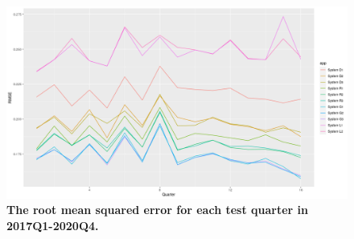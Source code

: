 \begin{figure}[ht]
\begin{center}
\includegraphics[scale=0.4]{./images/rmse_16windows}
\caption{{\bf The root mean squared error for each test quarter in 2017Q1-2020Q4.}\setlength{\baselineskip}{1.25em}}
\label{fig_errors_rmse}
\end{center}
\end{figure}